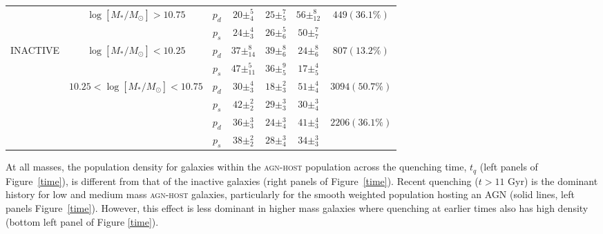 \begin{table}
{{\begin{tabular}{c|c|c|c|c|c|c}
                           & \multirow{2}{*}{$\log [M_*/M_{\odot}] > 10.75$}                      & $p_d$     & $20\pm_{4}^{5}$ & $25\pm_{5}^{7}$                    & $56\pm_{12}^{8}$       & \multirow{2}{*}{$449 (36.1\%)$}                      \\
                           &                                                 & $p_s$     & $24\pm_{3}^{4}$                     & $26\pm_{6}^{5}$                    & $50\pm_{7}^{7}$        &                                                      \\ \hline \hline
\multirow{6}{*}{INACTIVE}  & \multirow{2}{*}{$\log [M_*/M_{\odot}] < 10.25 $}                       & $p_d$     & $37\pm_{14}^{8}$                    & $39\pm_{6}^{8}$                    & $24\pm_{6}^{8}$        & \multirow{2}{*}{$807 (13.2\%)$}                      \\
                           &                                                 & $p_s$     & $47\pm_{11}^{5}$                    & $36\pm_{5}^{9}$                    & $17\pm_{5}^{4}$        &                                                      \\ \cline{2-7} 
                           & \multirow{2}{*}{$10.25 < \log [M_*/M_{\odot}] < 10.75$}                    & $p_d$     &          $30\pm_{3}^{4}$                          &       $18\pm_{3}^{2}$                            &    $51\pm_{4}^{4}$                   & \multirow{2}{*}{$3094 (50.7\%)$}                     \\
                           &                                                 & $p_s$     & $42\pm_{2}^{2}$            & $29\pm_{3}^{3}$   & $30\pm_{4}^{3}$ &                                                      \\ \cline{2-7} 
                           & {\multirow{2}{*}{$\log [M_*/M_{\odot}] > 10.75$}} & $p_d$     & $36\pm_{3}^{3}$            & $24\pm_{4}^{3}$         & $41\pm_{3}^{4}$ & \multicolumn{1}{l}{\multirow{2}{*}{$2206 (36.1\%)$}} \\
                           & \multicolumn{1}{l|}{}                           & $p_s$      & $38\pm_{2}^{2}$              & $28\pm_{4}^{3}$            & $34\pm_{3}^{3}$ & \multicolumn{1}{l}{}                                 \\ \hline                       
\end{tabular}}}
\end{table}

At all masses, the population density for galaxies within the \textsc{agn-host} population across the quenching time, $t_q$ (left panels of Figure~\ref{time}), is different from that of the inactive galaxies (right panels of Figure~\ref{time}). Recent quenching ($t > 11$ Gyr) is the dominant history for low and medium mass \textsc{agn-host} galaxies, particularly for the smooth weighted population hosting an AGN (solid lines, left panels Figure~\ref{time}). However, this effect is less dominant in higher mass galaxies where quenching at earlier times also has high density (bottom left panel of Figure \ref{time}).


